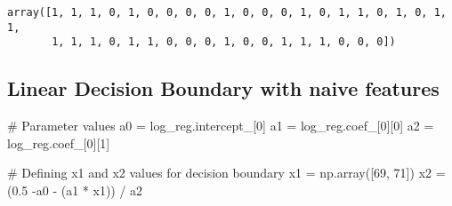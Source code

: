 \documentclass[
  letterpaper,
  DIV=11,
  numbers=noendperiod]{scrreprt}
\newenvironment{Shaded}{\begin{snugshade}}{\end{snugshade}}
\newcommand{\CommentTok}[1]{\textcolor[rgb]{0.37,0.37,0.37}{#1}}
\newcommand{\DecValTok}[1]{\textcolor[rgb]{0.68,0.00,0.00}{#1}}
\newcommand{\FloatTok}[1]{\textcolor[rgb]{0.68,0.00,0.00}{#1}}
\newcommand{\NormalTok}[1]{\textcolor[rgb]{0.00,0.23,0.31}{#1}}
\newcommand{\OperatorTok}[1]{\textcolor[rgb]{0.37,0.37,0.37}{#1}}
\begin{document}
\begin{verbatim}
array([1, 1, 1, 0, 1, 0, 0, 0, 0, 1, 0, 0, 0, 1, 0, 1, 1, 0, 1, 0, 1, 1,
       1, 1, 1, 0, 1, 1, 0, 0, 0, 1, 0, 0, 1, 1, 1, 0, 0, 0])
\end{verbatim}

\subsection{Linear Decision Boundary with naive
features}\label{linear-decision-boundary-with-naive-features}

\begin{Shaded}
\begin{Highlighting}[]
\CommentTok{\# Parameter values}
\NormalTok{a0 }\OperatorTok{=}\NormalTok{ log\_reg.intercept\_[}\DecValTok{0}\NormalTok{]}
\NormalTok{a1 }\OperatorTok{=}\NormalTok{ log\_reg.coef\_[}\DecValTok{0}\NormalTok{][}\DecValTok{0}\NormalTok{]}
\NormalTok{a2 }\OperatorTok{=}\NormalTok{ log\_reg.coef\_[}\DecValTok{0}\NormalTok{][}\DecValTok{1}\NormalTok{]}
\end{Highlighting}
\end{Shaded}

\begin{Shaded}
\begin{Highlighting}[]
\CommentTok{\# Defining x1 and x2 values for decision boundary}
\NormalTok{x1 }\OperatorTok{=}\NormalTok{ np.array([}\DecValTok{69}\NormalTok{, }\DecValTok{71}\NormalTok{])}
\NormalTok{x2 }\OperatorTok{=}\NormalTok{ (}\FloatTok{0.5} \OperatorTok{{-}}\NormalTok{a0 }\OperatorTok{{-}}\NormalTok{ (a1 }\OperatorTok{*}\NormalTok{ x1)) }\OperatorTok{/}\NormalTok{ a2}
\end{Highlighting}
\end{Shaded}
\end{document}
